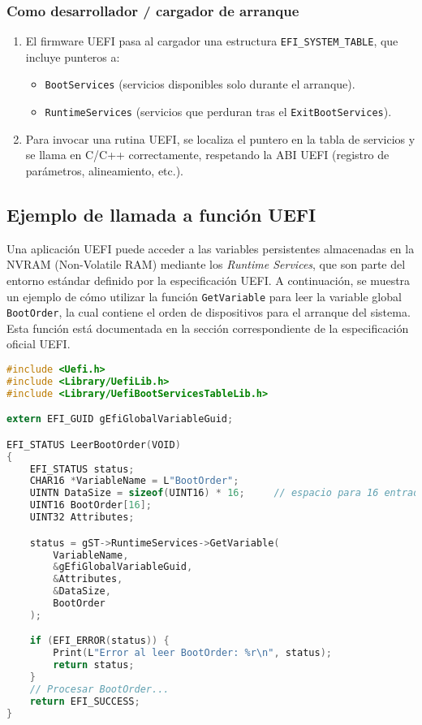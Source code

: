 \subsubsection*{Como desarrollador / cargador de arranque}
\begin{enumerate}[noitemsep]
  \item El firmware UEFI pasa al cargador una estructura \texttt{EFI\_SYSTEM\_TABLE},
        que incluye punteros a:
    \begin{itemize}[noitemsep]
      \item \texttt{BootServices} (servicios disponibles solo durante el arranque).
      \item \texttt{RuntimeServices} (servicios que perduran tras el \texttt{ExitBootServices}).
    \end{itemize}
  \item Para invocar una rutina UEFI, se localiza el puntero en la tabla de servicios
        y se llama en C/C++ correctamente, respetando la ABI UEFI
        (registro de parámetros, alineamiento, etc.).
\end{enumerate}

\newpage

\subsection{Ejemplo de llamada a función UEFI}

Una aplicación UEFI puede acceder a las variables persistentes almacenadas en la NVRAM (Non-Volatile RAM) mediante los \emph{Runtime Services}, que son parte del entorno estándar definido por la especificación UEFI. A continuación, se muestra un ejemplo de cómo utilizar la función \texttt{GetVariable} para leer la variable global \texttt{BootOrder}, la cual contiene el orden de dispositivos para el arranque del sistema. Esta función está documentada en la sección correspondiente de la especificación oficial UEFI.
\begin{lstlisting}[language=C,
                   caption={Lectura de la variable \texttt{BootOrder}},
                   label={lst:getvariable}]
#include <Uefi.h>
#include <Library/UefiLib.h>
#include <Library/UefiBootServicesTableLib.h>

extern EFI_GUID gEfiGlobalVariableGuid;

EFI_STATUS LeerBootOrder(VOID)
{
    EFI_STATUS status;
    CHAR16 *VariableName = L"BootOrder";
    UINTN DataSize = sizeof(UINT16) * 16;     // espacio para 16 entradas
    UINT16 BootOrder[16];
    UINT32 Attributes;

    status = gST->RuntimeServices->GetVariable(
        VariableName,
        &gEfiGlobalVariableGuid,
        &Attributes,
        &DataSize,
        BootOrder
    );

    if (EFI_ERROR(status)) {
        Print(L"Error al leer BootOrder: %r\n", status);
        return status;
    }
    // Procesar BootOrder...
    return EFI_SUCCESS;
}
\end{lstlisting}

